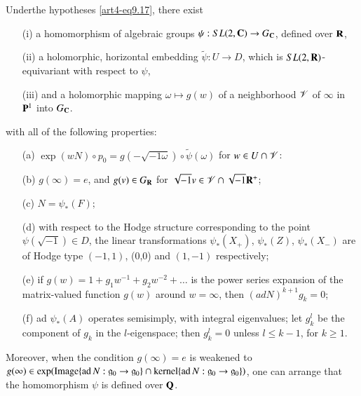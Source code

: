 \setcounter{theorem}{18}
\begin{theorem}\label{art4-thm9.19} 
Under\pageoriginale the hypotheses \eqref{art4-eq9.17}, there exist
\begin{itemize}
\item[{\rm (i)}] a homomorphism of algebraic groups $\psi: SL (2, \mathbf{C}) \to G_{\mathbf{C}}$, defined over $\mathbf{R}$,

\item[{\rm (ii)}] a holomorphic, horizontal embedding $\tilde{\psi}: U \to D$, which is $SL (2,\mathbf{R})$-equivariant with respect to $\psi$,

\item[{\rm (iii)}] and a holomorphic mapping $\omega \longmapsto g(w)$ of a neighborhood $\mathscr{V}$ of $\infty$ in $\mathbf{P}^1$ into $G_{\mathbf{C}}$.
\end{itemize}
with all of the following properties:
\begin{itemize}
\item[{\rm (a)}] $\exp(w N) \circ p_0 = g (- \sqrt{-1\omega}) \circ \tilde{\psi} (\omega)$ for $w \in U \cap \mathscr{V}$:

\item[{\rm (b)}] $g (\infty) = e$, and $g (v) \in G_{\mathbf{R}}$ for $\sqrt{-1} v \in \mathscr{V} \cap \sqrt{-1} \mathbf{R}^+$;

\item[{\rm (c)}] $N = \psi_\ast (F);$

\item[{\rm (d)}] with respect to the Hodge structure corresponding to the point $\psi (\sqrt{-1}) \in D$, the linear transformations $\psi_\ast(X_+)$, $\psi_\ast (Z)$, $\psi_\ast(X_-)$ are of Hodge type $(-1,1)$, (0,0) and $(1, -1)$ respectively;

\item[{\rm (e)}] if $g (w) = 1 + g_1 w^{-1} + g_2 w^{-2} + \ldots$ is the power series expansion of the matrix-valued function $g(w)$ around $w = \infty$, then $(ad N)^{k+1} g_k = 0$;

\item[{\rm (f)}] ad $\psi_\ast (A)$ operates semisimply, with integral eigenvalues; let $g^l_k$ be the component of $g_k$ in the $l$-eigenspace; then $g^l_k =0$ unless $l \leq k - 1$, for $k \geqslant 1$.
\end{itemize}

Moreover, when the condition $g(\infty) = e$ is weakened to $g(\infty) \in \exp (\operatorname{Image} \{\operatorname{ad} N : \mathfrak{g}_0 \to \mathfrak{g}_0\} \cap \operatorname{kernel} \{\operatorname{ad} N: \mathfrak{g}_0 \to \mathfrak{g}_0\})$, one can arrange that the homomorphism $\psi$ is defined over $\mathbf{Q}$.
\end{theorem}

